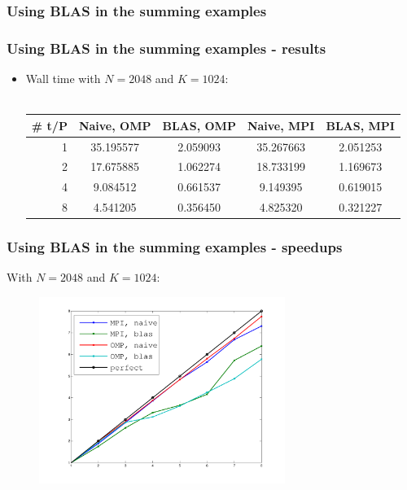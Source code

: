 \documentclass[ignorenonframetext]{beamer}
\begin{document}
\begin{frame}\frametitle{Using BLAS in the summing examples}

\end{frame}

\begin{frame}\frametitle{Using BLAS in the summing examples - results}
  \begin{itemize}
    \item Wall time with $N=2048$ and $K=1024$: \\
      \ \\
      \begin{tabular}{r|c|c|c|c}
        \# t/P & Naive, OMP & BLAS, OMP & Naive, MPI & BLAS, MPI \\
        \hline
             1 & 35.195577 & 2.059093 & 35.267663 & 2.051253 \\
             2 & 17.675885 & 1.062274 & 18.733199 & 1.169673 \\
             4 & 9.084512  & 0.661537 &  9.149395 & 0.619015 \\
             8 & 4.541205  & 0.356450 &  4.825320 & 0.321227
      \end{tabular}
  \end{itemize}
\end{frame}
\begin{frame}\frametitle{Using BLAS in the summing examples - speedups}
  With $N=2048$ and $K=1024$:
  \begin{figure}[H]
    \begin{center}
      \includegraphics[width=8cm]{speedups}
    \end{center}
  \end{figure}
\end{frame}
\end{document}
